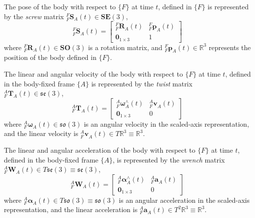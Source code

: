		The pose of the body with respect to $\{F\}$ at time $t$, defined in $\{F\}$ is represented by the \textit{screw} matrix ${^{F}_{F}\mathbf{S}^{}_{A}(t)} \in \mathbf{SE}(3)$,
		\begin{equation}
				{^{F}_{F}\mathbf{S}^{}_{A}(t)} = 
				\begin{bmatrix}
						  ^{F}_{F}\mathbf{R}^{}_{A}(t) 	& 	^{F}_{F}\mathbf{p}^{}_{A}(t)\\
						  \textbf{0}_{1 \times 3} & 1						  
				\end{bmatrix}
		\end{equation}
		where $^{F}_{F}\mathbf{R}^{}_{A}(t) \in \mathbf{SO}(3)$ is a rotation matrix, and $^{F}_{F}\mathbf{p}^{}_{A}(t) \in \mathbb{R}^3$ represents the position of the body defined in $\{F\}$.
		
		The linear and angular velocity of the body with respect to $\{F\}$ at time $t$, defined in the body-fixed frame $\{A\}$ is represented by the \textit{twist} matrix ${^{A}_{F}\mathbf{T}^{}_{A}(t)} \in \mathfrak{se}(3)$,
		\begin{equation}
				{^{A}_{F}\mathbf{T}^{}_{A}(t)} = 
				\begin{bmatrix}
		  {^{A}_{F}\bm{\omega}^{\wedge}_{A}}(t) 	& 	^{A}_{F}\mathbf{v}^{}_{A}(t)\\
		  \textbf{0}_{1 \times 3} & 0						  
				\end{bmatrix}
		\end{equation}
		where $^{A}_{F}\bm{\omega}^{}_{A}(t) \in \mathfrak{so}(3)$ is an angular velocity in the scaled-axis representation, and the linear velocity is $^{A}_{F}\mathbf{v}^{}_{A}(t) \in T\mathbb{R}^3 \equiv \mathbb{R}^3$.
				
		The linear and angular acceleration of the body with respect to $\{F\}$ at time $t$, defined in the body-fixed frame $\{A\}$, is represented by the \textit{wrench} matrix ${^{A}_{F}\mathbf{W}^{}_{A}(t)} \in T\mathfrak{se}(3) \equiv \mathfrak{se}(3)$,
		\begin{equation}
				{^{A}_{F}\mathbf{W}^{}_{A}(t)} = 
				\begin{bmatrix}
				  {^{A}_{F}\bm{\alpha}^{\wedge}_{A}}(t) 	& 	^{A}_{F}\mathbf{a}^{}_{A}(t)\\
				  \textbf{0}_{1 \times 3} & 0						  
				\end{bmatrix}
		\end{equation}
		where $^{A}_{F}\bm{\alpha}^{}_{A}(t) \in  T\mathfrak{so}(3) \equiv \mathfrak{so}(3)$ is an angular acceleration in the scaled-axis representation, and the linear acceleration is $^{A}_{F}\mathbf{a}^{}_{A}(t) \in T^2\mathbb{R}^3 \equiv \mathbb{R}^3$.
						
